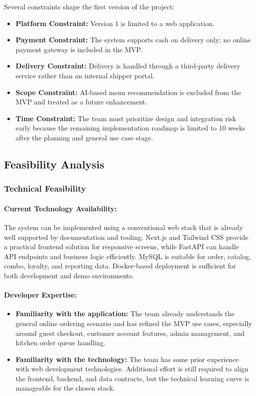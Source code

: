 Several constraints shape the first version of the project:
\begin{itemize}
    \item \textbf{Platform Constraint:} Version 1 is limited to a web application.
    \item \textbf{Payment Constraint:} The system supports cash on delivery only; no online payment gateway is included in the MVP.
    \item \textbf{Delivery Constraint:} Delivery is handled through a third-party delivery service rather than an internal shipper portal.
    \item \textbf{Scope Constraint:} AI-based menu recommendation is excluded from the MVP and treated as a future enhancement.
    \item \textbf{Time Constraint:} The team must prioritize design and integration risk early because the remaining implementation roadmap is limited to 10 weeks after the planning and general use case stage.
\end{itemize}

\subsection{Feasibility Analysis}

\subsubsection{Technical Feasibility}

\paragraph{Current Technology Availability:} The system can be implemented using a conventional web stack that is already well supported by documentation and tooling. Next.js and Tailwind CSS provide a practical frontend solution for responsive screens, while FastAPI can handle API endpoints and business logic efficiently. MySQL is suitable for order, catalog, combo, loyalty, and reporting data. Docker-based deployment is sufficient for both development and demo environments.

\paragraph{Developer Expertise:}
\begin{itemize}
    \item \textbf{Familiarity with the application:} The team already understands the general online ordering scenario and has refined the MVP use cases, especially around guest checkout, customer account features, admin management, and kitchen order queue handling.
    \item \textbf{Familiarity with the technology:} The team has some prior experience with web development technologies. Additional effort is still required to align the frontend, backend, and data contracts, but the technical learning curve is manageable for the chosen stack.
\end{itemize}


